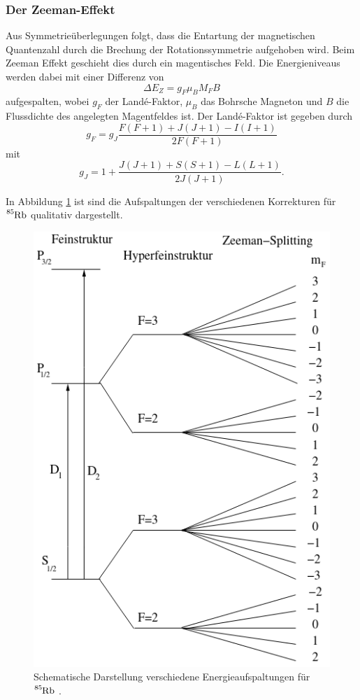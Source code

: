 \subsubsection{Der Zeeman-Effekt}
Aus Symmetrieüberlegungen folgt, dass die Entartung der magnetischen 
Quantenzahl durch die Brechung der Rotationssymmetrie aufgehoben wird.
Beim Zeeman Effekt geschieht dies durch ein magentisches Feld. 
Die Energieniveaus werden dabei mit einer Differenz von 
\begin{equation}
    \Delta E_Z=g_F\mu_B M_F B
\end{equation}
aufgespalten, wobei $g_F$ der Landé-Faktor, $\mu_B$ das Bohrsche Magneton
und $B$ die Flussdichte des angelegten Magentfeldes ist. Der Landé-Faktor
ist gegeben durch 
\begin{equation}
    g_F=g_J\frac{F(F+1)+J(J+1)-I(I+1)}{2F(F+1)}
    \label{eqn:gyrogyro}
\end{equation}
mit 
\begin{equation*}
    g_J=1+\frac{J(J+1)+S(S+1)-L(L+1)}{2J(J+1)}.
\end{equation*}

\noindent
In Abbildung \ref{fig:niveaus} ist sind die Aufspaltungen der verschiedenen
Korrekturen für $\ce{^{85}Rb}$ qualitativ dargestellt.
\begin{figure}[H]
    \centering
    \includegraphics[scale= 0.4]{pictures/Niveaus.png}
    \caption{Schematische Darstellung verschiedene Energieaufspaltungen für $\ce{^{85}Rb}$ \cite{OptischesPumpen}.}
    \label{fig:niveaus}
\end{figure}

